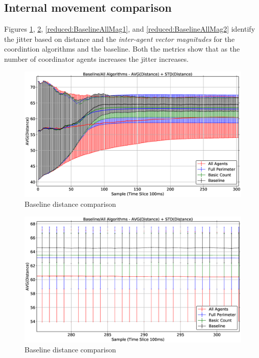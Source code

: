 \subsection{Internal movement comparison\label{section:stabilityComparison1}}
Figures \ref{reduced:BaselineAllDist1}, \ref{reduced:BaselineAllDist2}, \ref{reduced:BaselineAllMag1}, and \ref{reduced:BaselineAllMag2} identify the jitter based on distance and the \textit{inter-agent vector magnitudes} for the coordintion algorithms and the baseline. Both the metrics show that as the number of coordinator agents increases the jitter increases. 

\begin{figure}[H]
\begin{center}
\includegraphics[width=14cm]{CHAPTER-6/figures/BaselineAllDist1}
\end{center}
\caption{Baseline distance comparison\label{reduced:BaselineAllDist1}}
\end{figure}

\begin{figure}[H]
\begin{center}
\includegraphics[width=14cm]{CHAPTER-6/figures/BaselineAllDist2}
\end{center}
\caption{Baseline distance comparison\label{reduced:BaselineAllDist2}}
\end{figure}

